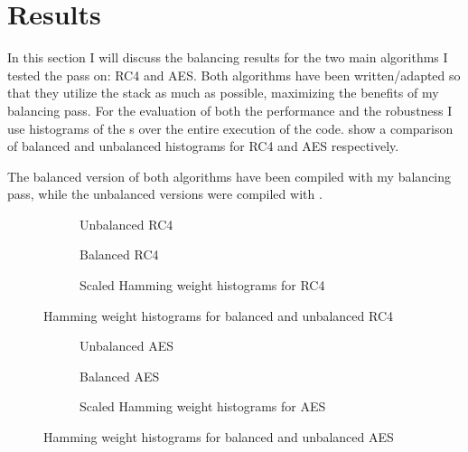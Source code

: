 \section{Results}
\label{results}
In this section I will discuss the balancing results for the two main algorithms I tested the pass on: RC4 and AES.
Both algorithms have been written/adapted so that they utilize the stack as much as possible, maximizing the benefits of my balancing pass.
For the evaluation of both the performance and the robustness I use histograms of the \hammingw{}s over the entire execution of the code.
 show a comparison of balanced and unbalanced histograms for RC4 and AES respectively.

The balanced version of both algorithms have been compiled with my balancing pass, while the unbalanced versions were compiled with \crossgcc.

\begin{figure}[hp]
  \centering
  \begin{subfigure}[b]{0.49\textwidth}
    
    \caption{Unbalanced RC4}
  \end{subfigure}
  \begin{subfigure}[b]{0.49\textwidth}
    
    \caption{Balanced RC4}
  \end{subfigure}

  \begin{subfigure}[b]{\textwidth}
    
    \caption{Scaled Hamming weight histograms for RC4}
  \end{subfigure}
  \caption{Hamming weight histograms for balanced and unbalanced RC4}
  \label{fig:rc4}
\end{figure}

\begin{figure}[hp]
  \centering
  \begin{subfigure}[b]{0.49\textwidth}
    
    \caption{Unbalanced AES}
  \end{subfigure}
  \begin{subfigure}[b]{0.49\textwidth}
    
    \caption{Balanced AES}
  \end{subfigure}

  \begin{subfigure}[b]{\textwidth}
    
    \caption{Scaled Hamming weight histograms for AES}
  \end{subfigure}
  \caption{Hamming weight histograms for balanced and unbalanced AES}
  \label{fig:aes}
\end{figure}

